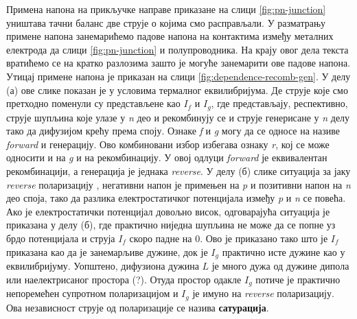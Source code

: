 \documentclass{article}
\begin{document}
Примена напона на прикључке направе приказане на слици \ref{fig:pn-junction} уништава тачни баланс две струје о којима смо расправљали. У разматрању примене напона занемарићемо падове напона на контактима између металних електрода да слици \ref{fig:pn-junction} и полупроводника. На крају овог дела текста вратићемо се на кратко разлозима зашто је могуће занемарити ове  падове напона. Утицај примене напона је приказан на слици \ref{fig:dependence-recomb-gen}. У делу (а) ове слике показан је у условима термалног еквилибријума. Де струје које смо претходно поменули су представљене као $I_f$ и $I_g$, где представљају, респективно, струје шупљина које улазе у \textit{n} део и рекомбинују се и струје генерисане у \textit{n} делу тако да дифузијом крећу према споју. Ознаке \textit{f} и \textit{g} могу да се односе на називе \textit{forward} и генерацију. Ово комбиновани избор избегава ознаку \textit{r}, кој се може односити и на \textit{g} и на рекомбинацију. У овој одлуци \textit{forward} је еквивалентан рекомбинацији, а генерација је једнака \textit{reverse}. У делу (б) слике ситуација за јаку \textit{reverse} поларизацију , негативни напон је примењен на \textit{p} и позитивни напон на \textit{n} део споја, тако да разлика електростатичког потенцијала између \textit{p} и \textit{n} се повећа. Ако је електростатички потенцијал довољно висок, одговарајућа ситуација је приказана у делу (б), где практично ниједна шупљина не може да се попне уз брдо потенцијала и струја $I_f$ скоро падне на 0. Ово је приказано тако што је $I_f$ приказана као да је занемарљиве дужине, док је $I_g$ практично исте дужине као у еквилибријуму. Уопштено, дифузиона дужина $L$ је много дужа од дужине дипола или наелектрисаног простора (?). Отуда простор одакле $I_g$ потиче је практично непоремећен супротном поларизацијом и $I_g$ је имуно на \textit{reverse}  поларизацију. Ова независност струје од поларизације се назива \textbf{сатурација}.


\end{document}
